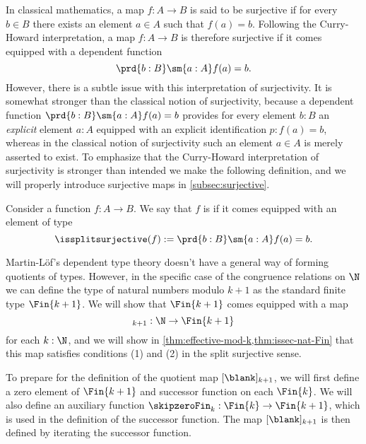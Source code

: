 In classical mathematics, a map $f:A\to B$ is said to be surjective if for every $b\in B$ there exists an element $a\in A$ such that $f(a)=b$. Following the Curry-Howard interpretation, a map $f:A\to B$ is therefore surjective if it comes equipped with a dependent function
\begin{equation*}
  \prd{b:B}\sm{a:A}f(a)=b.
\end{equation*}
However, there is a subtle issue with this interpretation of surjectivity. It is somewhat stronger than the classical notion of surjectivity, because a dependent function $\prd{b:B}\sm{a:A}f(a)=b$ provides for every element $b:B$ an \emph{explicit} element $a:A$ equipped with an explicit identification $p:f(a)=b$, whereas in the classical notion of surjectivity such an element $a\in A$ is merely asserted to exist. To emphasize that the Curry-Howard interpretation of surjectivity is stronger than intended we make the following definition, and we will properly introduce surjective maps in \cref{subsec:surjective}.

\begin{defn}
  Consider a function $f:A\to B$. We say that $f$ is  if it comes equipped with an element of type
  \begin{equation*}
    \issplitsurjective(f):=\prd{b:B}\sm{a:A}f(a)=b.
  \end{equation*}
\end{defn}

Martin-L\"of's dependent type theory doesn't have a general way of forming quotients of types. However, in the specific case of the congruence relations on $\N$ we can define the type of natural numbers modulo $k+1$ as the standard finite type $\Fin{k+1}$. We will show that $\Fin{k+1}$ comes equipped with a map
\begin{equation*}
  [\blank]_{k+1}:\N\to \Fin{k+1}
\end{equation*}
for each $k:\N$, and we will show in \cref{thm:effective-mod-k,thm:issec-nat-Fin} that this map satisfies conditions (1) and (2) in the split surjective sense.

To prepare for the definition of the quotient map $[\blank]_{k+1}$, we will first define a zero element of $\Fin{k+1}$ and successor function on each $\Fin{k}$. We will also define an auxiliary function $\skipzeroFin_k:\Fin{k}\to\Fin{k+1}$, which is used in the definition of the successor function. The map $[\blank]_{k+1}$ is then defined by iterating the successor function. 

